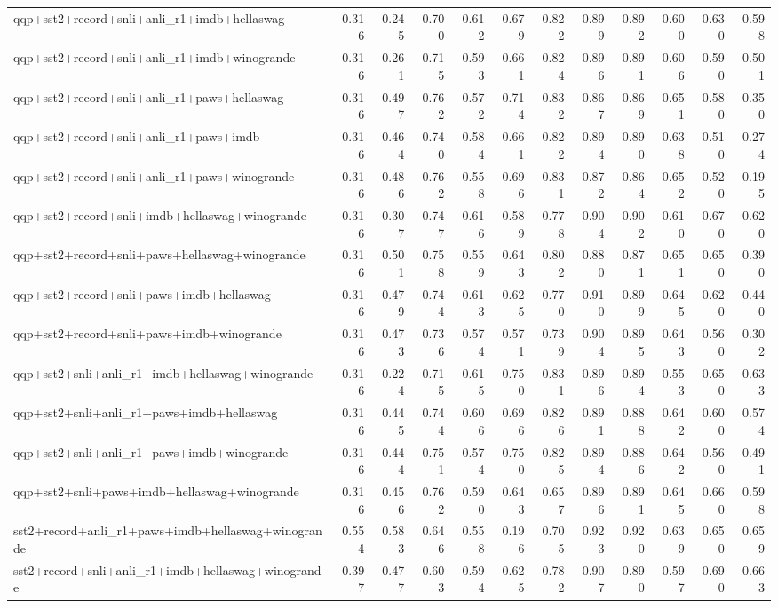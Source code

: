 \begin{table}[t]
\begin{tabular}{lrrrrrrrrrrr}
    qqp+sst2+record+snli+anli\_r1+imdb+hellaswag & 0.316 & 0.245 & 0.700 & 0.612 & 0.679 & 0.822 & 0.899 & 0.892 & 0.600 & 0.630 & 0.598 \\
    qqp+sst2+record+snli+anli\_r1+imdb+winogrande & 0.316 & 0.261 & 0.715 & 0.593 & 0.661 & 0.824 & 0.896 & 0.891 & 0.606 & 0.590 & 0.501 \\
    qqp+sst2+record+snli+anli\_r1+paws+hellaswag & 0.316 & 0.497 & 0.762 & 0.572 & 0.714 & 0.832 & 0.867 & 0.869 & 0.651 & 0.580 & 0.350 \\
    qqp+sst2+record+snli+anli\_r1+paws+imdb & 0.316 & 0.464 & 0.740 & 0.584 & 0.661 & 0.822 & 0.894 & 0.890 & 0.638 & 0.510 & 0.274 \\
    qqp+sst2+record+snli+anli\_r1+paws+winogrande & 0.316 & 0.486 & 0.762 & 0.558 & 0.696 & 0.831 & 0.872 & 0.864 & 0.652 & 0.520 & 0.195 \\
    qqp+sst2+record+snli+imdb+hellaswag+winogrande & 0.316 & 0.307 & 0.747 & 0.616 & 0.589 & 0.778 & 0.904 & 0.902 & 0.610 & 0.670 & 0.620 \\
    qqp+sst2+record+snli+paws+hellaswag+winogrande & 0.316 & 0.501 & 0.758 & 0.559 & 0.643 & 0.802 & 0.880 & 0.871 & 0.651 & 0.650 & 0.390 \\
    qqp+sst2+record+snli+paws+imdb+hellaswag & 0.316 & 0.479 & 0.744 & 0.613 & 0.625 & 0.770 & 0.910 & 0.899 & 0.645 & 0.620 & 0.440 \\
    qqp+sst2+record+snli+paws+imdb+winogrande & 0.316 & 0.473 & 0.736 & 0.574 & 0.571 & 0.739 & 0.904 & 0.895 & 0.643 & 0.560 & 0.302 \\
    qqp+sst2+snli+anli\_r1+imdb+hellaswag+winogrande & 0.316 & 0.224 & 0.715 & 0.615 & 0.750 & 0.831 & 0.896 & 0.894 & 0.553 & 0.650 & 0.633 \\
    qqp+sst2+snli+anli\_r1+paws+imdb+hellaswag & 0.316 & 0.445 & 0.744 & 0.606 & 0.696 & 0.826 & 0.891 & 0.888 & 0.642 & 0.600 & 0.574 \\
    qqp+sst2+snli+anli\_r1+paws+imdb+winogrande & 0.316 & 0.444 & 0.751 & 0.574 & 0.750 & 0.825 & 0.894 & 0.886 & 0.642 & 0.560 & 0.491 \\
    qqp+sst2+snli+paws+imdb+hellaswag+winogrande & 0.316 & 0.456 & 0.762 & 0.590 & 0.643 & 0.657 & 0.896 & 0.891 & 0.645 & 0.660 & 0.598 \\
    sst2+record+anli\_r1+paws+imdb+hellaswag+winogrande & 0.554 & 0.583 & 0.646 & 0.558 & 0.196 & 0.705 & 0.923 & 0.920 & 0.639 & 0.650 & 0.659 \\
    sst2+record+snli+anli\_r1+imdb+hellaswag+winogrande & 0.397 & 0.477 & 0.603 & 0.594 & 0.625 & 0.782 & 0.907 & 0.890 & 0.597 & 0.690 & 0.663 \\

\end{tabular}
\end{table}
